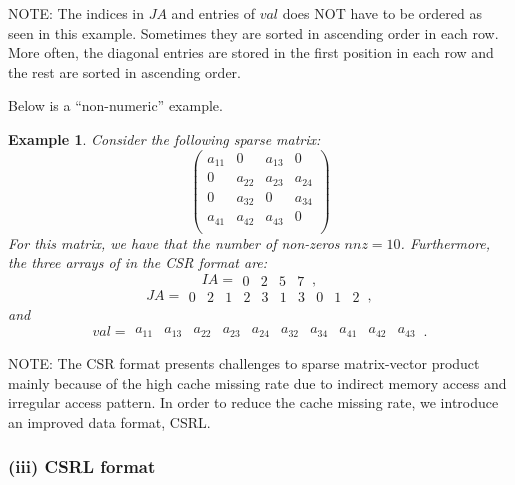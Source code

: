 \documentclass[11pt]{memoir}
\newtheorem{example}[theorem]{Example}
\begin{document}
\begin{snugshade}\noindent
NOTE: The indices in $JA$ and entries of $val$ does NOT have to be ordered as seen in this example. Sometimes they are sorted in ascending order in each row. More often, the diagonal entries are stored in the first position in each row and the rest are sorted in ascending order.
\end{snugshade}

Below is a ``non-numeric'' example.
%
\begin{example} Consider the following sparse matrix:
$$
\left(
\begin{array}{cccc}
a_{11} & 0 & a_{13} & 0 \\
0 & a_{22} & a_{23} & a_{24} \\
0 & a_{32} & 0 & a_{34} \\
a_{41}& a_{42} & a_{43} & 0 \\
\end{array}
\right)
$$
For this matrix, we have that the number of non-zeros $nnz=10$. Furthermore, the three arrays of in the CSR format are:
$$
IA =
\begin{array}{||c||c||c||c||}0&2&5&7\end{array}\, ,
$$
$$
JA =
\begin{array}{||c|c||c|c|c||c|c||c|c|c||}
0&2&1&2&3&1&3&0&1&2\end{array}\, ,
$$
and
$$
val =
\begin{array}{||c|c||c|c|c||c|c||c|c|c||}
a_{11} & a_{13} & a_{22} & a_{23} & a_{24} & a_{32} & a_{34} & a_{41} & a_{42} & a_{43}\end{array}\,.
$$
\end{example}

\begin{snugshade}\noindent
NOTE: The CSR format presents challenges to sparse matrix-vector product mainly because of the high cache missing rate due to indirect memory access and irregular access pattern. In order to reduce the cache missing rate, we introduce an improved data format, CSRL.
\end{snugshade}

\subsubsection*{(iii) CSRL format}
\end{document}
